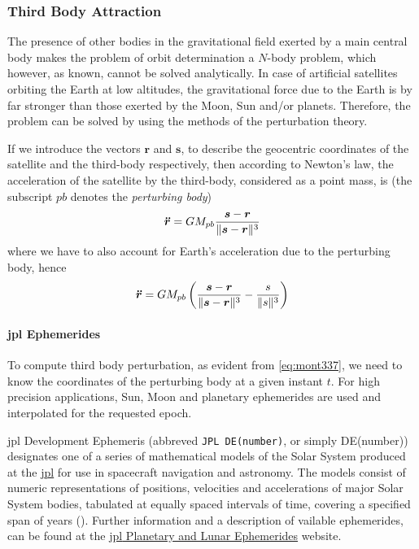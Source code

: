 \subsubsection{Third Body Attraction}\label{sssec:third-body-attraction}

The presence of other bodies in the gravitational ﬁeld exerted by a main central
body makes the problem of orbit determination a $N$-body problem, which however, as known, 
cannot be solved analytically. In case of artiﬁcial satellites orbiting the Earth 
at low altitudes, the gravitational force due to the Earth is by far stronger than 
those exerted by the Moon, Sun and/or planets. Therefore, the problem can be solved 
by using the methods of the perturbation theory.

If we introduce the vectors $\bm{r}$ and $\bm{s}$, to describe the geocentric 
coordinates of the satellite and the third-body respectively, then according to 
Newton's law, the acceleration of the satellite by the third-body, considered as 
a point mass, is (the subscript $pb$ denotes the \emph{perturbing body})
\begin{equation}
    \bm{\ddot{r}} = GM_{pb} \frac{\bm{s}-\bm{r}}
        {\lVert\bm{s}-\bm{r}\rVert^3}
\end{equation}
where we have to also account for Earth's acceleration due to the perturbing body, 
hence
\begin{equation}\label{eq:mont337}
    \bm{\ddot{r}} = GM_{pb} \left( 
        \frac{\bm{s}-\bm{r}}{\lVert\bm{s}-\bm{r}\rVert^3} 
        - \frac{s}{\lVert s\rVert^3} \right)
\end{equation}

\paragraph{\gls{jpl} Ephemerides}\label{par:jpl-ephemerides}

To compute third body perturbation, as evident from \ref{eq:mont337}, we need to 
know the coordinates of the perturbing body at a given instant $t$. For high 
precision applications, Sun, Moon and planetary ephemerides are used and interpolated 
for the requested epoch.

\gls{jpl} Development Ephemeris (abbreved \texttt{JPL DE(number)}, or simply DE(number)) 
designates one of a series of mathematical models of the Solar System produced at the 
\href{https://www.jpl.nasa.gov/}{\gls{jpl}} for use in spacecraft navigation and astronomy. 
The models consist of numeric representations of positions, velocities and accelerations 
of major Solar System bodies, tabulated at equally spaced intervals of time, covering 
a specified span of years (\cite{wiki-jplde}). Further information and a description of 
vailable ephemerides, can be found at the 
\href{https://ssd.jpl.nasa.gov/planets/eph_export.html}{\gls{jpl} Planetary and Lunar Ephemerides} 
website.

